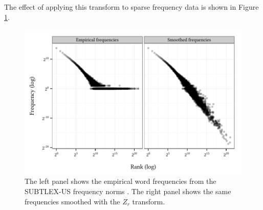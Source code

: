 \documentclass[12pt]{article}
\begin{document}
\noindent The effect of applying this transform to sparse frequency data is shown in Figure \ref{subtlex}.

\begin{figure}
\centering
\includegraphics{zr.pdf}
\caption{The left panel shows the empirical word frequencies from the SUBTLEX-US frequency norms \citep{Brysbaert2009}. The right panel shows the same frequencies smoothed with the $Z_r$ transform.}
\label{subtlex}
\end{figure}
\end{document}
